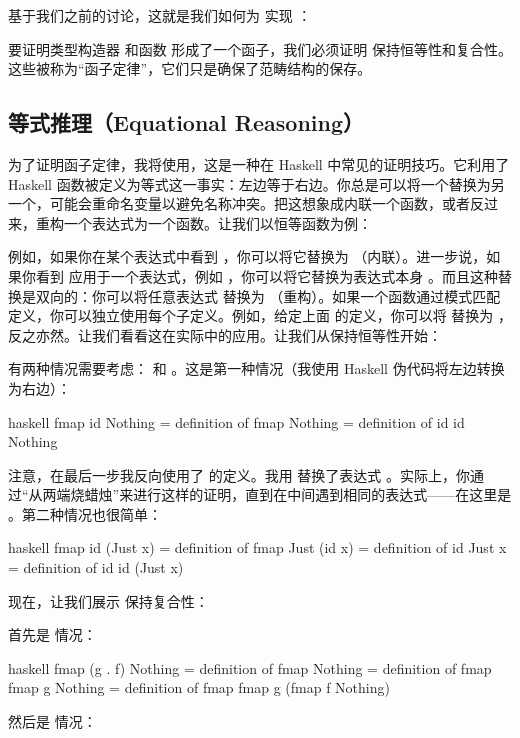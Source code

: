 基于我们之前的讨论，这就是我们如何为  实现 ：

要证明类型构造器  和函数  形成了一个函子，我们必须证明  保持恒等性和复合性。这些被称为“函子定律”，它们只是确保了范畴结构的保存。

\subsection{等式推理（Equational Reasoning）}

为了证明函子定律，我将使用，这是一种在 Haskell 中常见的证明技巧。它利用了 Haskell 函数被定义为等式这一事实：左边等于右边。你总是可以将一个替换为另一个，可能会重命名变量以避免名称冲突。把这想象成内联一个函数，或者反过来，重构一个表达式为一个函数。让我们以恒等函数为例：

例如，如果你在某个表达式中看到 ，你可以将它替换为 （内联）。进一步说，如果你看到  应用于一个表达式，例如 ，你可以将它替换为表达式本身 。而且这种替换是双向的：你可以将任意表达式  替换为 （重构）。如果一个函数通过模式匹配定义，你可以独立使用每个子定义。例如，给定上面  的定义，你可以将  替换为 ，反之亦然。让我们看看这在实际中的应用。让我们从保持恒等性开始：

有两种情况需要考虑： 和 。这是第一种情况（我使用 Haskell 伪代码将左边转换为右边）：

\begin{snip}{haskell}
  fmap id Nothing
  = { definition of fmap }
  Nothing
  = { definition of id }
  id Nothing
\end{snip}
注意，在最后一步我反向使用了  的定义。我用  替换了表达式 。实际上，你通过“从两端烧蜡烛”来进行这样的证明，直到在中间遇到相同的表达式——在这里是 。第二种情况也很简单：

\begin{snip}{haskell}
  fmap id (Just x)
  = { definition of fmap }
  Just (id x)
  = { definition of id }
  Just x
  = { definition of id }
  id (Just x)
\end{snip}
现在，让我们展示  保持复合性：

首先是  情况：

\begin{snip}{haskell}
  fmap (g . f) Nothing
  = { definition of fmap }
  Nothing
  = { definition of fmap }
  fmap g Nothing
  = { definition of fmap }
  fmap g (fmap f Nothing)
\end{snip}
然后是  情况：

